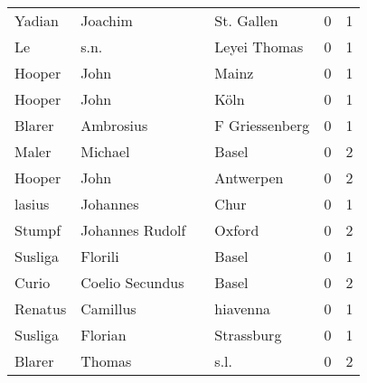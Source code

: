 \begin{tabular}{llllrr}
                   Yadian &                            Joachim &             &                                  St. Gallen &          0 &         1 \\
                       Le &                               s.n. &             &                                Leyei Thomas &          0 &         1 \\
                   Hooper &                               John &             &                                       Mainz &          0 &         1 \\
                   Hooper &                               John &             &                                        Köln &          0 &         1 \\
                   Blarer &                          Ambrosius &             &                              F Griessenberg &          0 &         1 \\
                    Maler &                            Michael &             &                                       Basel &          0 &         2 \\
                   Hooper &                               John &             &                                   Antwerpen &          0 &         2 \\
                   lasius &                           Johannes &             &                                        Chur &          0 &         1 \\
                   Stumpf &                    Johannes Rudolf &             &                                      Oxford &          0 &         2 \\
                  Susliga &                            Florili &             &                                       Basel &          0 &         1 \\
                    Curio &                    Coelio Secundus &             &                                       Basel &          0 &         2 \\
                  Renatus &                           Camillus &             &                                    hiavenna &          0 &         1 \\
                  Susliga &                            Florian &             &                                  Strassburg &          0 &         1 \\
                   Blarer &                             Thomas &             &                                        s.l. &          0 &         2 \\

\end{tabular}
